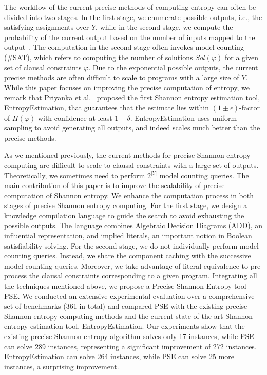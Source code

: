 The workflow of the current precise methods of computing entropy can often be divided into two stages. 
In the first stage, we enumerate possible outputs, i.e., the satisfying assignments over $Y$, while in the second stage, we compute the probability of the current output based on the number of inputs mapped to the output~\cite{golia2022scalable}.
The computation in the second stage often invokes model counting (\#SAT), which refers to computing the number of solutions $\mathit{Sol}(\varphi)$ for a given set of clausal constraints $\varphi$. 
Due to the exponential possible outputs, the current precise methods are often difficult to scale to programs with a large size of $Y$.
While this paper focuses on improving the precise computation of entropy, we remark that Priyanka et al.~\cite{golia2022scalable} proposed the first Shannon entropy estimation tool, EntropyEstimation, that guarantees that the estimate lies within $(1 \pm \epsilon)$-factor of $H(\varphi)$ with confidence at least $1-\delta$.
EntropyEstimation uses uniform sampling to avoid generating all outputs, and indeed scales much better than the precise methods. 

As we mentioned previously, the current methods for precise Shannon entropy computing are difficult to scale to clausal constraints with a large set of outputs.
Theoretically, we sometimes need to perform $2^{|Y|}$ model counting queries. 
The main contribution of this paper is to improve the scalability of precise computation of Shannon entropy. 
We enhance the computation process in both stages of precise Shannon entropy computing.
For the first stage, we design a knowledge compilation language to guide the search to avoid exhausting the possible outputs. 
The language combines Algebraic Decision Diagrams (ADD), an influential representation, and implied literals, an important notion in Boolean satisfiability solving.
For the second stage, we do not individually perform model counting queries.
Instead, we share the component caching with the successive model counting queries.
Moreover, we take advantage of literal equivalence to pre-process the clausal constraints corresponding to a given program.
Integrating all the techniques mentioned above, we propose a Precise Shannon Entropy tool PSE.
We conducted an extensive experimental evaluation over a comprehensive set of benchmarks (361 in total) and compared PSE with the existing precise Shannon entropy computing methods and the current state-of-the-art Shannon entropy estimation tool, EntropyEstimation.
Our experiments show that the existing precise Shannon entropy algorithm solves only 17 instances, while PSE can solve 289 instances, representing a significant improvement of 272 instances.
EntropyEstimation can solve 264 instances, while PSE can solve 25 more instances, a surprising improvement.

